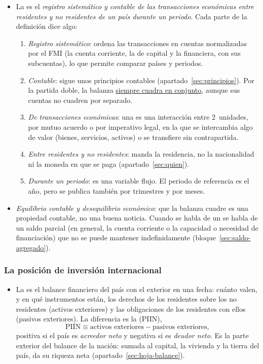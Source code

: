 \documentclass[11pt]{article}
\begin{document}
\begin{itemize}
\item La  es el \emph{registro sistemático y contable de las transacciones económicas entre residentes y no residentes de un país durante un periodo}. Cada parte de la definición dice algo:
  \begin{enumerate}
  \item \emph{Registro sistemático}: ordena las transacciones en cuentas normalizadas por el FMI (la cuenta corriente, la de capital y la financiera, con sus subcuentas), lo que permite comparar países y periodos.
  \item \emph{Contable}: sigue unos principios contables (apartado~\ref{sec:principios}). Por la partida doble, la balanza \uline{siempre cuadra en conjunto}, aunque sus cuentas no cuadren por separado.
  \item \emph{De transacciones económicas}: una  es una interacción entre 2~unidades, por mutuo acuerdo o por imperativo legal, en la que se intercambia algo de valor (bienes, servicios, activos) o se transfiere sin contrapartida.
  \item \emph{Entre residentes y no residentes}: manda la residencia, no la nacionalidad ni la moneda en que se paga (apartado~\ref{sec:quien}).
  \item \emph{Durante un periodo}: es una variable flujo. El periodo de referencia es el año, pero se publica también por trimestres y por meses.
  \end{enumerate}

\item \emph{Equilibrio contable y desequilibrio económico}: que la balanza cuadre es una propiedad contable, no una buena noticia. Cuando se habla de un  se habla de un saldo parcial (en general, la cuenta corriente o la capacidad o necesidad de financiación) que no se puede mantener indefinidamente (bloque~\ref{sec:saldo-agregado}).
\end{itemize}

\subsubsection{La posición de inversión internacional}\label{sec:concepto-pii}

\begin{itemize}
\item La  es el balance financiero del país con el exterior en una fecha: cuánto valen, y en qué instrumentos están, los derechos de los residentes sobre los no residentes (activos exteriores) y las obligaciones de los residentes con ellos (pasivos exteriores). La diferencia es la  (PIIN),
\[
\mathrm{PIIN}\equiv\text{activos exteriores}-\text{pasivos exteriores},
\]
positiva si el país es \emph{acreedor neto} y negativa si es \emph{deudor neto}. Es la parte exterior del balance de la nación: sumada al capital, la vivienda y la tierra del país, da su riqueza neta (apartado~\ref{sec:hoja-balance}).
\end{itemize}
\end{document}
